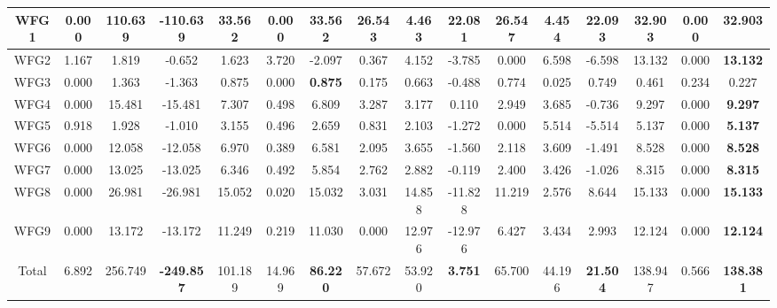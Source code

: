 \begin{table}[t]
{\begin{tabular}{c|c|c|c|c|c|c|c|c|c|c|c|c|c|c|c}
WFG1 & 0.000 & 110.639 & -110.639 & 33.562 & 0.000 & \textbf{33.562} & 26.543 & 4.463 & 22.081 & 26.547 & 4.454 & 22.093 & 32.903 & 0.000 & 32.903 \\ \hline
WFG2 & 1.167 & 1.819 & -0.652 & 1.623 & 3.720 & -2.097 & 0.367 & 4.152 & -3.785 & 0.000 & 6.598 & -6.598 & 13.132 & 0.000 & \textbf{13.132} \\ \hline
WFG3 & 0.000 & 1.363 & -1.363 & 0.875 & 0.000 & \textbf{0.875} & 0.175 & 0.663 & -0.488 & 0.774 & 0.025 & 0.749 & 0.461 & 0.234 & 0.227 \\ \hline
WFG4 & 0.000 & 15.481 & -15.481 & 7.307 & 0.498 & 6.809 & 3.287 & 3.177 & 0.110 & 2.949 & 3.685 & -0.736 & 9.297 & 0.000 & \textbf{9.297} \\ \hline
WFG5 & 0.918 & 1.928 & -1.010 & 3.155 & 0.496 & 2.659 & 0.831 & 2.103 & -1.272 & 0.000 & 5.514 & -5.514 & 5.137 & 0.000 & \textbf{5.137} \\ \hline
WFG6 & 0.000 & 12.058 & -12.058 & 6.970 & 0.389 & 6.581 & 2.095 & 3.655 & -1.560 & 2.118 & 3.609 & -1.491 & 8.528 & 0.000 & \textbf{8.528} \\ \hline
WFG7 & 0.000 & 13.025 & -13.025 & 6.346 & 0.492 & 5.854 & 2.762 & 2.882 & -0.119 & 2.400 & 3.426 & -1.026 & 8.315 & 0.000 & \textbf{8.315} \\ \hline
WFG8 & 0.000 & 26.981 & -26.981 & 15.052 & 0.020 & 15.032 & 3.031 & 14.858 & -11.828 & 11.219 & 2.576 & 8.644 & 15.133 & 0.000 & \textbf{15.133} \\ \hline
WFG9 & 0.000 & 13.172 & -13.172 & 11.249 & 0.219 & 11.030 & 0.000 & 12.976 & -12.976 & 6.427 & 3.434 & 2.993 & 12.124 & 0.000 & \textbf{12.124} \\ \hline
Total & 6.892 & 256.749 & \textbf{-249.857} & 101.189 & 14.969 & \textbf{86.220} & 57.672 & 53.920 & \textbf{3.751} & 65.700 & 44.196 & \textbf{21.504} & 138.947 & 0.566 & \textbf{138.381} \\ \hline
\end{tabular}%
}
\end{table}




